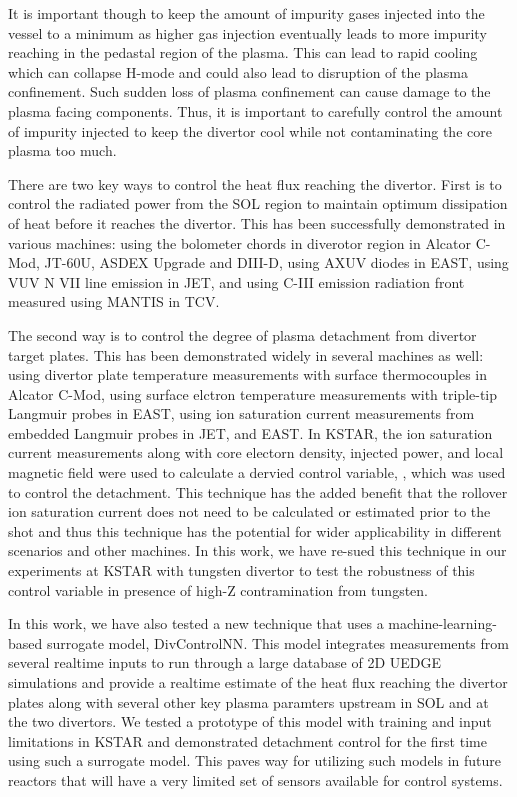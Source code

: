 It is important though to keep the amount of impurity gases injected into the vessel to a minimum as higher gas injection eventually leads to more impurity reaching in the pedastal region of the plasma.
This can lead to rapid cooling which can collapse H-mode and could also lead to disruption of the plasma confinement.
Such sudden loss of plasma confinement can cause damage to the plasma facing components.
Thus, it is important to carefully control the amount of impurity injected to keep the divertor cool while not contaminating the core plasma too much.

There are two key ways to control the heat flux reaching the divertor.
First is to control the radiated power from the \ac{SOL} region to maintain optimum dissipation of heat before it reaches the divertor.
This has been successfully demonstrated in various machines:
using the bolometer chords in diverotor region in Alcator C-Mod\cite{Goetz_1999_POP}, JT-60U\cite{Asakura_2009_NF}, ASDEX Upgrade\cite{Kallenbach_2012_NF} and DIII-D\cite{Eldon_2019_NME},
using AXUV diodes in EAST\cite{Wu_2018_NF},
using VUV N VII line emission in JET\cite{Maddison_2011_NF}, and
using C-III emission radiation front measured using MANTIS in TCV\cite{Ravensbergen_2021_NC}.

The second way is to control the degree of plasma detachment from divertor target plates.
This has been demonstrated widely in several machines as well:
using divertor plate temperature measurements with surface thermocouples in Alcator C-Mod\cite{Brunner_2017_NF},
using surface elctron temperature measurements with triple-tip Langmuir probes in EAST\cite{Eldon_2021_NME},
using ion saturation current measurements from embedded Langmuir probes in JET\cite{Guillemaut_2017_PPCF}, and EAST\cite{Yuan_2020_FED}.
In KSTAR, the ion saturation current measurements along with core electorn density, injected power, and local magnetic field were used to calculate a dervied control variable, \Afrac, which was used to control the detachment\cite{Eldon_2022_PPCF}.
This technique has the added benefit that the rollover ion saturation current does not need to be calculated or estimated prior to the shot and thus this technique has the potential for wider applicability in different scenarios and other machines.
In this work, we have re-sued this technique in our experiments at KSTAR with tungsten divertor to test the robustness of this control variable in presence of high-Z contramination from tungsten.

In this work, we have also tested a new technique that uses a machine-learning-based surrogate model, DivControlNN\cite{Zhu_2025_InPrep}.
This model integrates measurements from several realtime inputs to run through a large database of 2D UEDGE simulations and provide a realtime estimate of the heat flux reaching the divertor plates along with several other key plasma paramters upstream in \ac{SOL} and at the two divertors.
We tested a prototype of this model with training and input limitations in KSTAR and demonstrated detachment control for the first time using such a surrogate model.
This paves way for utilizing such models in future reactors that will have a very limited set of sensors available for control systems.

